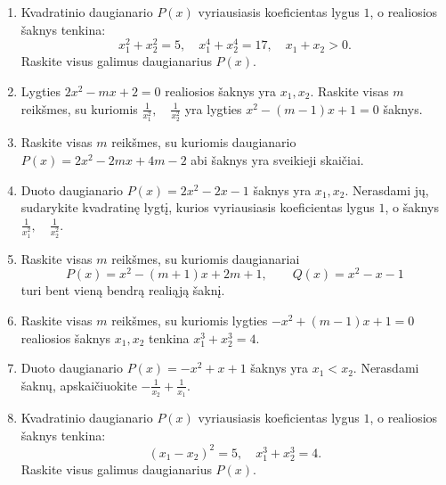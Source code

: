 \documentclass[11pt,a4paper]{article}
\begin{document}
\begin{enumerate}
\item \begin{minipage}[t]{\linewidth}Kvadratinio daugianario \(P(x)\) vyriausiasis koeficientas lygus \(1\), o realiosios šaknys tenkina: \[x_1^2+x_2^2=5,\quad x_1^4+x_2^4=17,\quad x_1+x_2>0.\] Raskite visus galimus daugianarius \(P(x)\).\end{minipage}
\item \begin{minipage}[t]{\linewidth}Lygties \(2x^{2}-mx+2=0\) realiosios šaknys yra \(x_1,x_2\). Raskite visas \(m\) reikšmes, su kuriomis \mbox{\(\frac1{x_1^2},\quad\frac1{x_2^2}\)} yra lygties \(x^{2}-\left(m - 1\right)x+1=0\) šaknys.\end{minipage}
\item \begin{minipage}[t]{\linewidth}Raskite visas \(m\) reikšmes, su kuriomis daugianario \(P(x)=2x^{2}-2 mx+4 m - 2\) abi šaknys yra sveikieji skaičiai.\end{minipage}
\item \begin{minipage}[t]{\linewidth}Duoto daugianario \(P(x)=2x^{2}-2x-1\) šaknys yra \(x_1,x_2\). Nerasdami jų, sudarykite kvadratinę lygtį, kurios vyriausiasis koeficientas lygus \(1\), o šaknys \mbox{\(\frac{1}{x_{1}^{2}},\quad \frac{1}{x_{2}^{2}}\)}.\end{minipage}
\item \begin{minipage}[t]{\linewidth}Raskite visas \(m\) reikšmes, su kuriomis daugianariai \[P(x)=x^{2}-\left(m + 1\right)x+2 m + 1,\qquad Q(x)=x^{2}-x-1\] turi bent vieną bendrą realiąją šaknį.\end{minipage}
\item \begin{minipage}[t]{\linewidth}Raskite visas \(m\) reikšmes, su kuriomis lygties \(-x^{2}+\left(m - 1\right)x+1=0\) realiosios šaknys \(x_1,x_2\) tenkina \mbox{\(x_1^3+x_2^3=4\)}.\end{minipage}
\item \begin{minipage}[t]{\linewidth}Duoto daugianario \(P(x)=-x^{2}+x+1\) šaknys yra \(x_1<x_2\). Nerasdami šaknų, apskaičiuokite \mbox{\(- \frac{1}{x_{2}} + \frac{1}{x_{1}}\)}.\end{minipage}
\item \begin{minipage}[t]{\linewidth}Kvadratinio daugianario \(P(x)\) vyriausiasis koeficientas lygus \(1\), o realiosios šaknys tenkina: \[(x_1-x_2)^2=5,\quad x_1^3+x_2^3=4.\] Raskite visus galimus daugianarius \(P(x)\).\end{minipage}

\end{enumerate}
\end{document}
